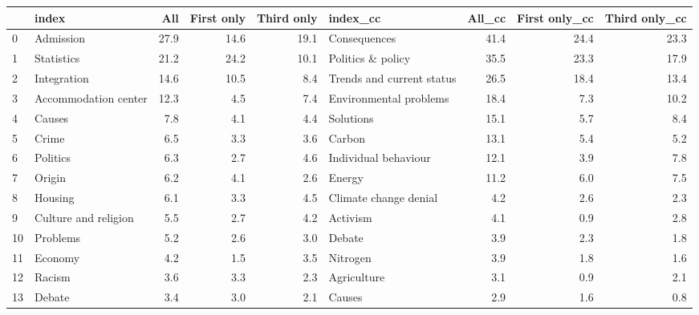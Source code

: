 \begin{tabular}{llrrrlrrr}
\toprule
{} &                 index &   All &  First only &  Third only &                   index\_cc &  All\_cc &  First only\_cc &  Third only\_cc \\
\midrule
0  &             Admission &  27.9 &        14.6 &        19.1 &               Consequences &    41.4 &           24.4 &           23.3 \\
1  &            Statistics &  21.2 &        24.2 &        10.1 &          Politics \& policy &    35.5 &           23.3 &           17.9 \\
2  &           Integration &  14.6 &        10.5 &         8.4 &  Trends and current status &    26.5 &           18.4 &           13.4 \\
3  &  Accommodation center &  12.3 &         4.5 &         7.4 &     Environmental problems &    18.4 &            7.3 &           10.2 \\
4  &                Causes &   7.8 &         4.1 &         4.4 &                  Solutions &    15.1 &            5.7 &            8.4 \\
5  &                 Crime &   6.5 &         3.3 &         3.6 &                     Carbon &    13.1 &            5.4 &            5.2 \\
6  &              Politics &   6.3 &         2.7 &         4.6 &       Individual behaviour &    12.1 &            3.9 &            7.8 \\
7  &                Origin &   6.2 &         4.1 &         2.6 &                     Energy &    11.2 &            6.0 &            7.5 \\
8  &               Housing &   6.1 &         3.3 &         4.5 &      Climate change denial &     4.2 &            2.6 &            2.3 \\
9  &  Culture and religion &   5.5 &         2.7 &         4.2 &                   Activism &     4.1 &            0.9 &            2.8 \\
10 &              Problems &   5.2 &         2.6 &         3.0 &                     Debate &     3.9 &            2.3 &            1.8 \\
11 &               Economy &   4.2 &         1.5 &         3.5 &                   Nitrogen &     3.9 &            1.8 &            1.6 \\
12 &                Racism &   3.6 &         3.3 &         2.3 &                Agriculture &     3.1 &            0.9 &            2.1 \\
13 &                Debate &   3.4 &         3.0 &         2.1 &                     Causes &     2.9 &            1.6 &            0.8 \\

\end{tabular}

